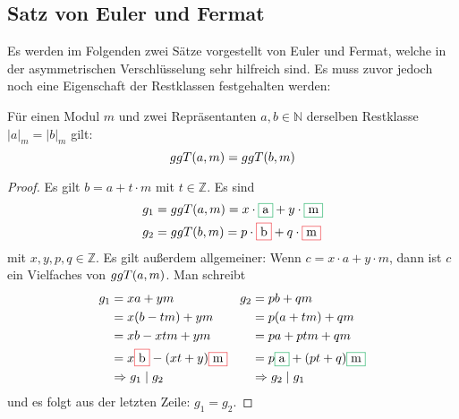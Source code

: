 \subsection{Satz von Euler und Fermat}
Es werden im Folgenden zwei Sätze vorgestellt von Euler und Fermat, welche
in der asymmetrischen Verschlüsselung sehr hilfreich sind. Es muss zuvor jedoch noch eine
Eigenschaft der Restklassen festgehalten werden:

\begin{satz}
  \label{satz:restklasse-ggt}
  Für einen Modul $m$ und zwei Repräsentanten $a,b \in \mathbb{N}$ derselben
  Restklasse $\vert a \vert_m = \vert b \vert_m$ gilt:
  \begin{equation*}
    ggT(a,m) = ggT(b,m)
  \end{equation*}
\end{satz}
\begin{proof}
  Es gilt $b = a + t \cdot m$ mit $t \in \mathbb{Z}$. Es sind
  \begin{align*}
    g_1 & = \ggt{a}{m} = x \cdot \fcolorbox{Green}{White}{a} + y \cdot \fcolorbox{Green}{White}{m} \\
    g_2 & = \ggt{b}{m} = p \cdot \fcolorbox{Red}{White}{b} + q \cdot \fcolorbox{Red}{White}{m}
  \end{align*}
  mit $x,y,p,q \in \mathbb{Z}$. Es gilt außerdem allgemeiner: Wenn $c = x \cdot a + y \cdot m$,
  dann ist $c$ ein Vielfaches von $ggT(a,m)$.
  Man schreibt
  \begin{align*}
    g_1 & = xa + ym                                                        & g_2 & = pb + qm                                                            \\
        & = x(b - tm) + ym                                                 &     & = p(a + tm) + qm                                                     \\
        & = xb - xtm + ym                                                  &     & = pa + ptm + qm                                                      \\
        & = x\fcolorbox{Red}{White}{b} - (xt + y)\fcolorbox{Red}{White}{m} &     & = p\fcolorbox{Green}{White}{a} + (pt + q)\fcolorbox{Green}{White}{m} \\
        & \Rightarrow g_1 \mid g_2                                         &     & \Rightarrow g_2 \mid g_1
  \end{align*}
  und es folgt aus der letzten Zeile: $g_1 = g_2$.
\end{proof}


